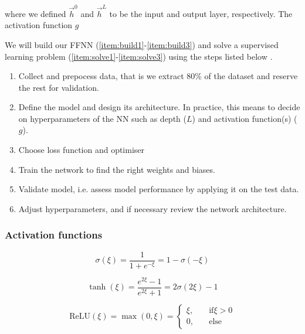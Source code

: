     where we defined $\vec{h}^0$ and $\vec{h}^L$ to be the input and output layer, respectively. The activation function $g$ \fillertext

    We will build our FFNN (\ref{item:build1}-\ref{item:build3}) and solve a supervised learning problem (\ref{item:solve1}-\ref{item:solve3}) using the steps listed below \citep{mhjensen}.

    \begin{enumerate}[label=(\roman*)]
        \item\label{item:build1} Collect and prepocess data, that is we extract 80\% of the dataset and reserve the rest for validation. 
        \item\label{item:build2} Define the model and design its architecture. In practice, this means to decide on hyperparameters of the NN such as depth ($L$) and activation function(s) ($g$).
        \item\label{item:build3} Choose loss function and optimiser 
        \item\label{item:solve1} Train the network to find the right weights and biases.
        \item\label{item:solve2} Validate model, i.e. assess model performance by applying it on the test data.
        \item\label{item:solve3} Adjust hyperparameters, and if necessary review the network architecture.
    \end{enumerate}



    \subsubsection{Activation functions}\label{sec:activation_function}

    
    \begin{equation}\label{eq:sigmoid}
        \sigma(\xi) = \frac{1}{1+e^{-\xi}} = 1- \sigma(-\xi)
    \end{equation}

    \begin{equation}\label{eq:tanh}
        \tanh(\xi) = \frac{e^{2\xi}-1}{e^{2\xi}+1} = 2\sigma(2\xi) -1
    \end{equation}

    \begin{equation}\label{eq:relu}
        \mathrm{ReLU}(\xi) = \max(0,\xi) = \begin{cases}
            \xi,\quad &\mathrm{if } \xi >0 \\
            0,\quad &\mathrm{else}
        \end{cases}
    \end{equation}

